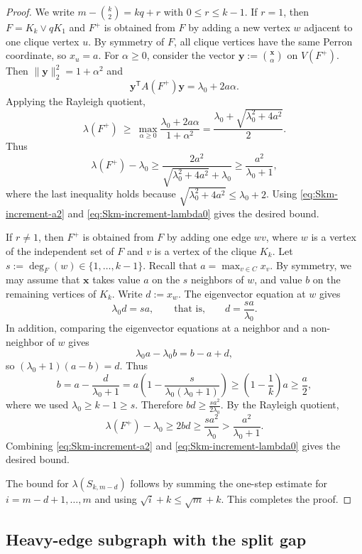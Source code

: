 \documentclass[11pt]{article}
\theoremstyle{definition}
\theoremstyle{plain}
\begin{document}
\begin{proof}
We write $m-\binom{k}{2}=kq+r$ with $0\le r\le k-1$.
If $r=1$, then $F=K_k\vee qK_1$ and $F^+$ is obtained from $F$ by adding a new vertex $w$ adjacent to one clique vertex $u$.
By symmetry of $F$, all clique vertices have the same Perron coordinate, so $x_u=a$.
For $\alpha\ge 0$, consider the vector $\bm{y}:={\bm{x} \choose \alpha}$ on $V(F^+)$.
Then $\| \bm{y}\|_2^2=1+\alpha^2$ and
\[
        \bm{y}^{\mathsf T}A(F^+) \bm{y}=\lambda_0+2a\alpha.
\]
Applying the Rayleigh quotient,
\[
  \lambda(F^+)
  \ \ge\
  \max_{\alpha\ge 0}\frac{\lambda_0+2a\alpha}{1+\alpha^2}
  =
  \frac{\lambda_0+\sqrt{\lambda_0^2+4a^2}}{2}.
\]
Thus
\[
  \lambda(F^+)-\lambda_0
  \ge
  \frac{2a^2}{\sqrt{\lambda_0^2+4a^2}+\lambda_0}
  \ge
  \frac{a^2}{\lambda_0+1},
\]
where the last inequality holds because $\sqrt{\lambda_0^2+4a^2}\le \lambda_0+2$.
Using \eqref{eq:Skm-increment-a2} and \eqref{eq:Skm-increment-lambda0} gives the desired bound.

If $r\neq 1$, then $F^+$ is obtained from $F$ by adding one edge $wv$, where $w$ is a vertex of the independent set of $F$
and $v$ is a vertex of the clique $K_k$.
Let $s:=\deg_F(w)\in\{1,\dots,k-1\}$. 
Recall that $a=\max_{v\in C}x_v$. 
By symmetry, we may assume that $\bm{x}$ takes value $a$ on the $s$ neighbors of $w$, and value $b$ on the remaining vertices of $K_k$.  
Write $d:=x_w$.
The eigenvector equation at \(w\) gives
\[
        \lambda_0 d=sa,
        \qquad\text{that is,}\qquad
        d=\frac{sa}{\lambda_0}.
\]
In addition, comparing the eigenvector equations at a neighbor and a non-neighbor of $w$ gives 
\[
        \lambda_0 a - \lambda_0 b = b-a+d,
\]
so  $(\lambda_0+1)(a-b)=d.$
Thus
\[
  b
  =
  a-\frac{d}{\lambda_0+1}
  =
  a\left(1-\frac{s}{\lambda_0(\lambda_0+1)}\right)
  \ge
  \left(1-\frac1k \right)a
  \ge
  \frac{a}{2},
\]
where we used $\lambda_0\ge k-1 \ge s$.
Therefore $bd\ge \frac{sa^2}{2\lambda_0}$. By the Rayleigh quotient,
\[
  \lambda(F^+)-\lambda_0
  \ge
  2bd
  \ge
  \frac{sa^2}{\lambda_0}
  >
  \frac{a^2}{\lambda_0+1}.
\]
Combining \eqref{eq:Skm-increment-a2} and \eqref{eq:Skm-increment-lambda0} gives the desired bound. 

The bound for $\lambda(S_{k,m-d})$ follows by summing the one-step estimate for $i=m-d+1,\dots,m$ and using $\sqrt i+k\le \sqrt m+k$. This completes the proof.
\end{proof}

\subsection{Heavy-edge subgraph with the split gap}
\end{document}
